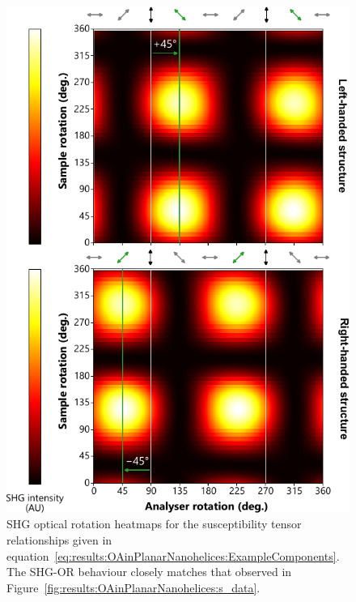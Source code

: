 \begin{figure}[htb!]	
    \centering	
    \includegraphics[scale=1]{./figures/results/OAinPlanarNanohelices/sim_data.pdf}

    \caption{\label{fig:results:OAinPlanarNanohelices:sim_data}
    SHG optical rotation heatmaps for the susceptibility tensor relationships given in equation~\ref{eq:results:OAinPlanarNanohelices:ExampleComponents}. The SHG-OR behaviour closely matches that observed in Figure~\ref{fig:results:OAinPlanarNanohelices:s_data}.}
\end{figure}

